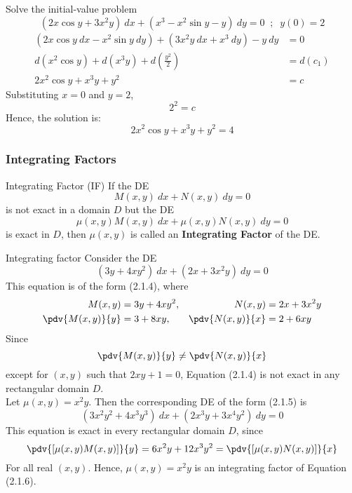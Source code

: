\begin{example}{Solve the initial-value problem \[
        (2x\cos y + 3x^2y) \: d{x} + (x^3 - x^2\sin y - y) \: d{y} = 0 \;\;;\;\; y(0) = 2
    \] \vspace{-40pt}
}{}
    \begin{align*}
        (2x\cos y \: dx - x^2\sin y \: d{y}) + (3x^2y \: d{x} + x^3 \: d{y}) - y \: d{y} &= 0 \\
        d(x^2 \cos y) + d(x^3y) + d(\frac{y^2}{2}) &= d(c_1) \\
        2x^2 \cos y + x^3y + y^2 &= c 
    \end{align*}
    Substituting $x=0$ and $y=2$,
    \[ 2^2 = c \]
    Hence, the solution is: \[
        2x^2 \cos y + x^3y + y^2 = 4 
    \]
\end{example}


\subsubsection{Integrating Factors}

\begin{definition}{Integrating Factor (IF)}{}
    If the DE
    \begin{equation}
        M(x,y) \: d{x} + N(x,y) \: d{y} = 0
    \end{equation}
    is not exact in a domain $D$ but the DE
    \begin{equation}
        \mu(x,y)M(x,y) \: d{x} + \mu(x,y)N(x,y) \: d{y} = 0
    \end{equation}
    is exact in $D$, then $\mu(x,y)$ is called an \textbf{Integrating Factor} of the DE.
\end{definition}

\begin{example}{Integrating factor}{}
    Consider the DE
    \begin{equation}
        (3y + 4xy^2) \: d{x} + (2x + 3x^2y) \: d{y} = 0
    \end{equation}
    This equation is of the form (2.1.4), where
     \begin{align*}
        M(x,y) &= 3y+4xy^2 ,& N(x,y) &= 2x+3x^2y \\
        \pdv{M(x,y)}{y} &= 3+8xy ,& \pdv{N(x,y)}{x} &= 2+6xy
    \end{align*}
    Since \[
        \pdv{M(x,y)}{y} \neq \pdv{N(x,y)}{x}
    \] except for $(x,y)$ such that $2xy + 1 = 0$, Equation (2.1.4) is not exact in any rectangular domain $D$. \\
    Let $\mu(x,y) = x^2y$. Then the corresponding DE of the form (2.1.5) is \[
        (3x^2y^2 + 4x^3y^3) \: d{x} + (2x^3y + 3x^4y^2) \: d{y} = 0
    \]
    This equation is exact in every rectangular domain $D$, since
    \[
        \pdv{[\mu(x,y)M(x,y)]}{y} = 6x^2y+12x^3y^2 = \pdv{[\mu(x,y)N(x,y)]}{x} 
    \]
    For all real $(x,y)$. Hence, $\mu(x,y) = x^2y$ is an integrating factor of Equation (2.1.6).
\end{example}

